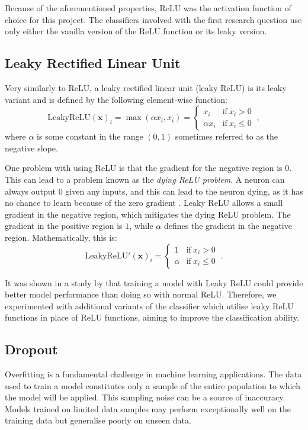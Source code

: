 \documentclass{l4proj}
\begin{document}
Because of the aforementioned properties, ReLU was the activation function of choice for this project. The classifiers involved with the first research question use only either the vanilla version of the ReLU function or its leaky version.

\subsection{Leaky Rectified Linear Unit} \label{sec:LeakyReLU}
Very similarly to ReLU, a leaky rectified linear unit (leaky ReLU) is its leaky variant and is defined by the following element-wise function:
\begin{equation}
    \text{LeakyReLU}(\boldsymbol{x})_i = \max(\alpha x_i, x_i) = 
    \begin{cases}
        x_i & \text{if} \ x_i > 0 \\
        \alpha x_i & \text{if} \ x_i \leq 0
    \end{cases}
    \ ,
\end{equation}
where $\alpha$ is some constant in the range $(0, 1)$ sometimes referred to as the negative slope.

One problem with using ReLU is that the gradient for the negative region is $0$. This can lead to a problem known as the \emph{dying ReLU problem}. A neuron can always output $0$ given any inputs, and this can lead to the neuron dying, as it has no chance to learn because of the zero gradient \citep{Lu2020}. Leaky ReLU allows a small gradient in the negative region, which mitigates the dying ReLU problem. The gradient in the positive region is $1$, while $\alpha$ defines the gradient in the negative region. Mathematically, this is:
\begin{equation}
    \text{LeakyReLU}'(\boldsymbol{x})_i = 
    \begin{cases}
        1 & \text{if} \ x_i > 0 \\
        \alpha & \text{if} \ x_i \leq 0
    \end{cases} \ .
\end{equation}

It was shown in a study by \cite{xu2015} that training a model with Leaky ReLU could provide better model performance than doing so with normal ReLU. Therefore, we experimented with additional variants of the classifier which utilise leaky ReLU functions in place of ReLU functions, aiming to improve the classification ability.

\subsection{Dropout} \label{sec:dropout}
Overfitting is a fundamental challenge in machine learning applications. The data used to train a model constitutes only a sample of the entire population to which the model will be applied. This sampling noise can be a source of inaccuracy. Models trained on limited data samples may perform exceptionally well on the training data but generalise poorly on unseen data.
\end{document}
